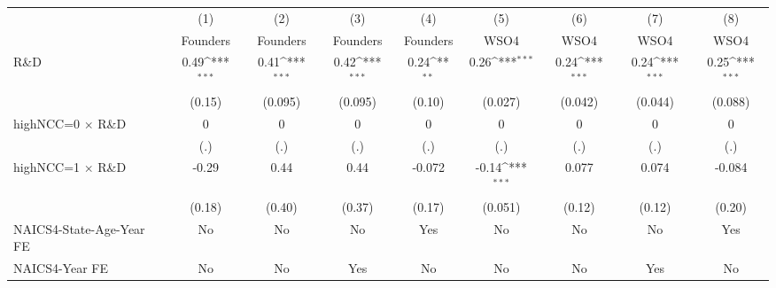 {
\def\sym#1{\ifmmode^{#1}\else\(^{#1}\)\fi}
\begin{tabular}{l*{8}{c}}
\toprule
                    &\multicolumn{1}{c}{(1)}&\multicolumn{1}{c}{(2)}&\multicolumn{1}{c}{(3)}&\multicolumn{1}{c}{(4)}&\multicolumn{1}{c}{(5)}&\multicolumn{1}{c}{(6)}&\multicolumn{1}{c}{(7)}&\multicolumn{1}{c}{(8)}\\
                    &\multicolumn{1}{c}{Founders}&\multicolumn{1}{c}{Founders}&\multicolumn{1}{c}{Founders}&\multicolumn{1}{c}{Founders}&\multicolumn{1}{c}{WSO4}&\multicolumn{1}{c}{WSO4}&\multicolumn{1}{c}{WSO4}&\multicolumn{1}{c}{WSO4}\\
\midrule
R\&D                &        0.49\sym{***}&        0.41\sym{***}&        0.42\sym{***}&        0.24\sym{**} &        0.26\sym{***}&        0.24\sym{***}&        0.24\sym{***}&        0.25\sym{***}\\
                    &      (0.15)         &     (0.095)         &     (0.095)         &      (0.10)         &     (0.027)         &     (0.042)         &     (0.044)         &     (0.088)         \\
\addlinespace
highNCC=0 $\times$ R\&D&           0         &           0         &           0         &           0         &           0         &           0         &           0         &           0         \\
                    &         (.)         &         (.)         &         (.)         &         (.)         &         (.)         &         (.)         &         (.)         &         (.)         \\
\addlinespace
highNCC=1 $\times$ R\&D&       -0.29         &        0.44         &        0.44         &      -0.072         &       -0.14\sym{***}&       0.077         &       0.074         &      -0.084         \\
                    &      (0.18)         &      (0.40)         &      (0.37)         &      (0.17)         &     (0.051)         &      (0.12)         &      (0.12)         &      (0.20)         \\
\addlinespace
NAICS4-State-Age-Year FE&          No         &          No         &          No         &         Yes         &          No         &          No         &          No         &         Yes         \\
\addlinespace
NAICS4-Year FE      &          No         &          No         &         Yes         &          No         &          No         &          No         &         Yes         &          No         \\

\end{tabular}}
